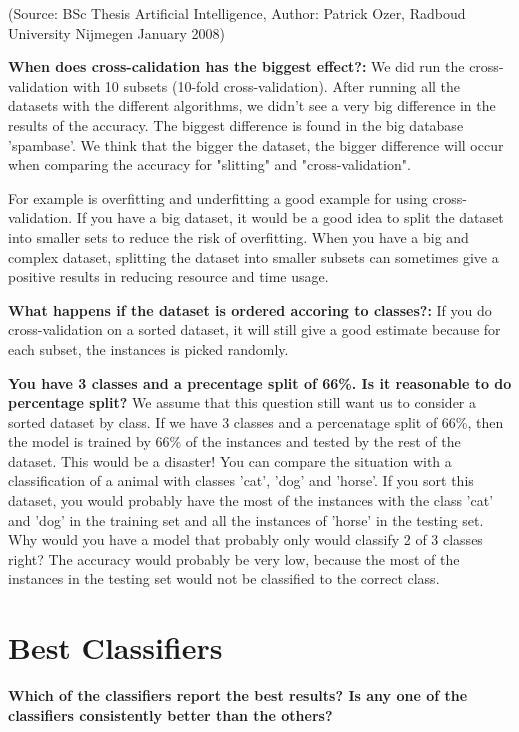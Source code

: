 			(Source: BSc Thesis Artificial Intelligence, Author: Patrick Ozer, Radboud University 
			Nijmegen January 2008)

		{\bf When does cross-calidation has the biggest effect?:} 
			We did run the cross-validation with 10 subsets (10-fold cross-validation).
			After running all the datasets with the different algorithms, we didn't see 
			a very big difference in the results of the accuracy. The biggest difference is found
			in the big database 'spambase'. We think that the bigger the dataset, the bigger
			difference will occur when comparing the accuracy for "slitting" and "cross-validation".

			For example is overfitting and underfitting a good example for using
			cross-validation. If you have a big dataset, it would be a good idea to split the dataset into
			smaller sets to reduce the risk of overfitting. 
			When you have a big and complex dataset, splitting the dataset into smaller subsets
			can sometimes give a positive results in reducing resource and time usage.


		{\bf What happens if the dataset is ordered accoring to classes?:} 
			If you do cross-validation on a sorted dataset, it will still give a good estimate
			because for each subset, the instances is picked randomly. 

		{\bf You have 3 classes and a precentage split of 66\%. Is it reasonable to do percentage split?}
			We assume that this question still want us to consider a sorted dataset by class.
			If we have 3 classes and a percenatage split of 66\%, then the model is trained by
			66\% of the instances and tested by the rest of the dataset. This would be a disaster!
			You can compare the situation with a classification of a animal with classes 'cat', 'dog' and 'horse'.
			If you sort this dataset, you would probably have the most of the instances with the class
			'cat' and 'dog' in the training set and all the instances of 'horse' in the testing set. 
			Why would you have a model that probably only would classify 2 of 3 classes right?
			The accuracy would probably be very low, because the most of the instances in the testing set
			would not be classified to the correct class. 

	\section*{Best Classifiers}
		{\bf Which of the classifiers report the best results? Is any one of the classifiers consistently 
		better than the others?}

